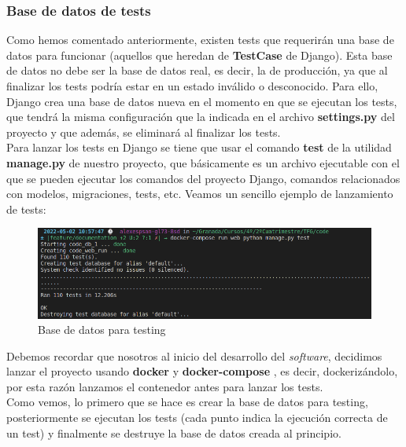 \subsubsection{Base de datos de tests}
Como hemos comentado anteriormente, existen tests que requerirán una base de datos para
funcionar (aquellos que heredan de \textbf{TestCase} de Django). Esta base de datos no debe
ser la base de datos real, es decir, la de producción, ya que al finalizar los tests podría
estar en un estado inválido o desconocido. Para ello, Django crea una base de datos nueva
en el momento en que se ejecutan los tests, que tendrá la misma configuración que la
indicada en el archivo \textbf{settings.py} del proyecto y que además, se eliminará al
finalizar los tests.\\

Para lanzar los tests en Django se tiene que usar el comando \textbf{test} de la utilidad
\textbf{manage.py} de nuestro proyecto, que básicamente es un archivo ejecutable con el
que se pueden ejecutar los comandos del proyecto Django, comandos relacionados con modelos,
migraciones, tests, etc. Veamos un sencillo ejemplo de lanzamiento de tests:

    \begin{figure}[H]
        \centering
        \includegraphics[scale=0.40]{imagenes/db-test.png}
        \caption{Base de datos para testing}
        \label{fig:db-test}
    \end{figure}

Debemos recordar que nosotros al inicio del desarrollo del \textit{software}, decidimos
lanzar el proyecto usando \textbf{docker} \cite{docker} y \textbf{docker-compose}
\cite{docker-compose}, es decir, dockerizándolo, por esta razón lanzamos el contenedor
antes para lanzar los tests.\\

Como vemos, lo primero que se hace es crear la base de datos para testing, posteriormente
se ejecutan los tests (cada punto indica la ejecución correcta de un test) y finalmente se
destruye la base de datos creada al principio.\\

